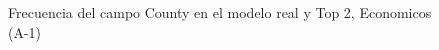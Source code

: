 \begin{figure}[H]
    \centering
    
    \caption{Frecuencia del campo County en el modelo real y Top 2, Economicos (A-1)}
    \label{frecuency-County-top2}
\end{figure}